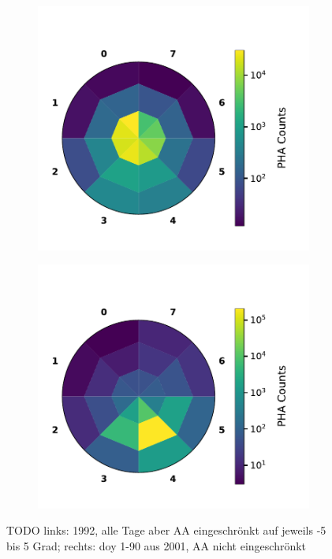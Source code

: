 \begin{figure}
	\centering
	\begin{subfigure}{.5\textwidth}
		\centering
		\includegraphics[width=1\textwidth]{Figures/hist_sec_det_noaa.pdf}
	\end{subfigure}%
	\begin{subfigure}{.5\textwidth}
		\centering
		\includegraphics[width=1\textwidth]{Figures/hist_sec_det_aa.pdf}
	\end{subfigure}
	\caption{TODO links: 1992, alle Tage aber AA eingeschrönkt auf jeweils -5 bis 5 Grad; rechts: doy 1-90 aus 2001, AA nicht eingeschrönkt}
\label{fig:histdetsecaa}
\end{figure}




